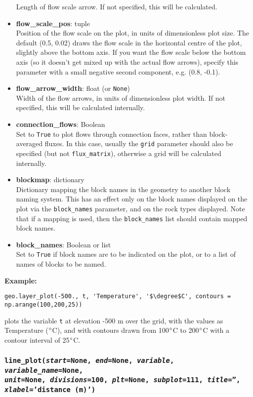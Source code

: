 \begin{itemize}
  Length of flow scale arrow.  If not specified, this will be calculated.
\item \textbf{flow\_scale\_pos}: tuple\\
  Position of the flow scale on the plot, in units of dimensionless plot size.  The default (0.5, 0.02) draws the flow scale in the horizontal centre of the plot, slightly above the bottom axis.  If you want the flow scale below the bottom axis (so it doesn't get mixed up with the actual flow arrows), specify this parameter with a small negative second component, e.g. (0.8, -0.1).
\item \textbf{flow\_arrow\_width}: float (or \texttt{None})\\
  Width of the flow arrows, in units of dimensionless plot width.  If not specified, this will be calculated internally.
\item \textbf{connection\_flows}: Boolean\\
  Set to \texttt{True} to plot flows through connection faces, rather than block-averaged fluxes.  In this case, usually the \texttt{grid} parameter should also be specified (but not \texttt{flux\_matrix}), otherwise a grid will be calculated internally.
\item \textbf{blockmap}: dictionary\\
  Dictionary mapping the block names in the geometry to another block naming system. This has an effect only on the block names displayed on the plot via the \texttt{block\_names} parameter, and on the rock types displayed. Note that if a mapping is used, then the \texttt{block\_names} list should contain mapped block names.
\item \textbf{block\_names}: Boolean or list\\
  Set to \texttt{True} if block names are to be indicated on the plot, or to a list of names of blocks to be named.
\end{itemize}

\textbf{Example:}

\begin{lstlisting}
geo.layer_plot(-500., t, 'Temperature', '$\degree$C', contours = np.arange(100,200,25))
\end{lstlisting}

plots the variable \texttt{t} at elevation -500 m over the grid, with the values as Temperature ($\degree$C), and with contours drawn from 100$\degree$C to 200$\degree$C with a contour interval of 25$\degree$C.

\begin{snugshade}
\subsubsection{\texttt{line\_plot(\emph{start}=None, \emph{end}=None, \emph{variable}, \emph{variable\_name}=None,\\
\emph{unit}=None, \emph{divisions}=100, \emph{plt}=None, \emph{subplot}=111, \emph{title}='',\\
\emph{xlabel}='distance (m)')}}\end{snugshade}
\label{sec:mulgrid:line_plot}

